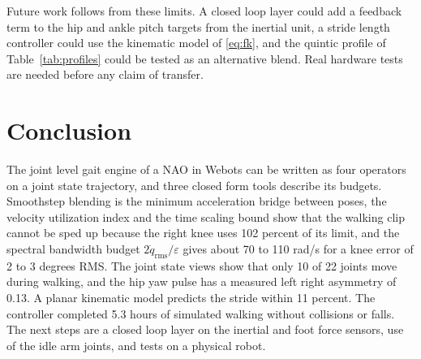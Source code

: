 \documentclass[10pt,journal]{IEEEtran}
\begin{document}
Future work follows from these limits. A closed loop layer could add a feedback term to the hip and ankle pitch targets from the inertial unit, a stride length controller could use the kinematic model of \eqref{eq:fk}, and the quintic profile of Table~\ref{tab:profiles} could be tested as an alternative blend. Real hardware tests are needed before any claim of transfer.

\section{Conclusion}
The joint level gait engine of a NAO in Webots can be written as four operators on a joint state trajectory, and three closed form tools describe its budgets. Smoothstep blending is the minimum acceleration bridge between poses, the velocity utilization index and the time scaling bound show that the walking clip cannot be sped up because the right knee uses 102 percent of its limit, and the spectral bandwidth budget $2\dot q_{\mathrm{rms}}/\varepsilon$ gives about 70 to 110 rad/s for a knee error of 2 to 3 degrees RMS. The joint state views show that only 10 of 22 joints move during walking, and the hip yaw pulse has a measured left right asymmetry of 0.13. A planar kinematic model predicts the stride within 11 percent. The controller completed 5.3 hours of simulated walking without collisions or falls. The next steps are a closed loop layer on the inertial and foot force sensors, use of the idle arm joints, and tests on a physical robot.
\end{document}
